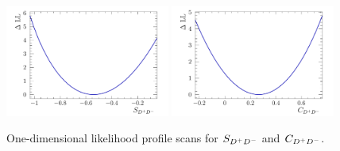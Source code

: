 \begin{figure}[htb]
\centering
\includegraphics[width=0.48\textwidth]{07-B02DD/tikz/pdf/Likelihoodscan_sin2b.pdf}
\includegraphics[width=0.48\textwidth]{07-B02DD/tikz/pdf/Likelihoodscan_C.pdf}
\caption{One-dimensional likelihood profile scans for $S_{{{D}^+}{{D}^-}}$ and $C_{{{D}^+}{{D}^-}}$.}
\label{fig:b02dd:decaytimefit:1DLLScan}
\end{figure}

